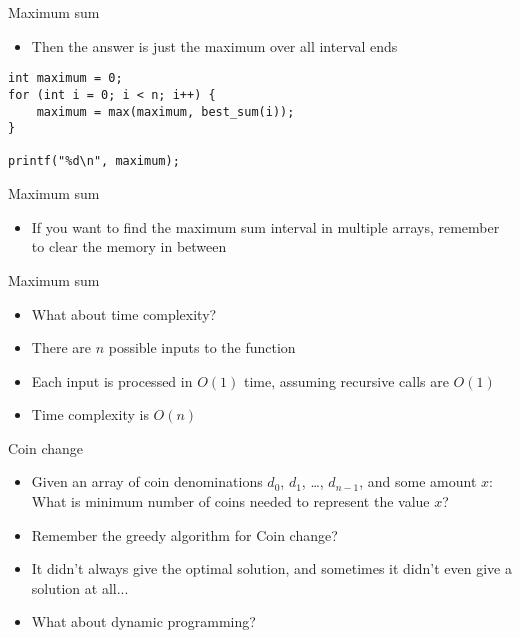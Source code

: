 \documentclass[10pt]{beamer}
\newcommand{\bi}{\begin{itemize}}
\newcommand{\ei}{\end{itemize}}
\begin{document}
\begin{frame}[fragile]{Maximum sum}
    \bi
        \item Then the answer is just the maximum over all interval ends
    \ei

    \begin{verbatim}
int maximum = 0;
for (int i = 0; i < n; i++) {
    maximum = max(maximum, best_sum(i));
}

printf("%d\n", maximum);
    \end{verbatim}
\end{frame}

\begin{frame}[fragile]{Maximum sum}
    \vspace{40pt}
    \bi
        \item If you want to find the maximum sum interval in multiple arrays, remember to clear the memory in between
    \ei
\end{frame}

\begin{frame}{Maximum sum}
    \vspace{20pt}
    \bi
        \item What about time complexity?
        \vspace{5pt}
        \item There are $n$ possible inputs to the function
        \item Each input is processed in $O(1)$ time, assuming recursive calls are $O(1)$
        \item Time complexity is $O(n)$
    \ei
\end{frame}

\begin{frame}{Coin change}
    \vspace{20pt}

    \bi
\item Given an array of coin denominations $d_0$, $d_1$, \ldots, $d_{n-1}$,
            and some amount $x$: What is minimum number of coins needed to
            represent the value $x$?

        \item Remember the greedy algorithm for Coin change?
        \item It didn't always give the optimal solution, and sometimes it didn't even give a solution at all...

        \vspace{10pt}
        \item What about dynamic programming?
    \ei
\end{frame}
\end{document}
